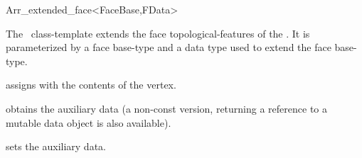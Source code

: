 
\ccRefPageBegin

\begin{ccRefClass}{Arr_extended_face<FaceBase,FData>}

\ccThreeToTwo

\ccDefinition
  The \ccRefName\ class-template extends the face topological-features of the
  \dcel. It is parameterized by a face base-type  and a data type
   used to extend the face base-type.


\ccIsModel

\ccInheritsFrom

\ccCreation
{}
  {assigns \ccVar{} with the contents of the  vertex.}

\ccAccessFunctions

\def\ccLongFuncLayout{\ccTrue}
  {obtains the auxiliary data (a non-const version, returning a reference
   to a mutable data object is also available).}
\def\ccLongParamLayout{\ccFalse}

\ccModifiers
  {sets the auxiliary data.}

\ccSeeAlso

\end{ccRefClass}

\ccRefPageEnd
